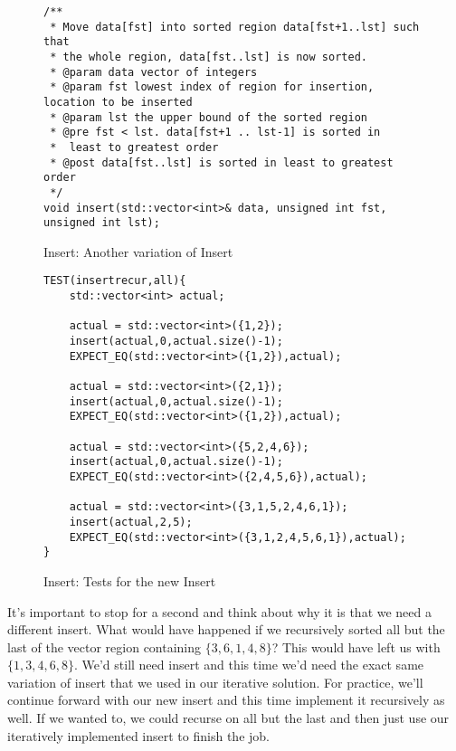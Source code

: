 \documentclass[]{tufte-handout}
\begin{document}
\begin{figure}[!htbp]
\begin{lstlisting}
/**
 * Move data[fst] into sorted region data[fst+1..lst] such that
 * the whole region, data[fst..lst] is now sorted.
 * @param data vector of integers
 * @param fst lowest index of region for insertion, location to be inserted
 * @param lst the upper bound of the sorted region
 * @pre fst < lst. data[fst+1 .. lst-1] is sorted in
 *  least to greatest order
 * @post data[fst..lst] is sorted in least to greatest order
 */
void insert(std::vector<int>& data, unsigned int fst, unsigned int lst);
\end{lstlisting}
\caption{Insert: Another variation of Insert}
\label{code:insertrecdecl}
\end{figure}

\begin{figure}[!htbp]
\begin{lstlisting}
TEST(insertrecur,all){
    std::vector<int> actual;

    actual = std::vector<int>({1,2});
    insert(actual,0,actual.size()-1);
    EXPECT_EQ(std::vector<int>({1,2}),actual);

    actual = std::vector<int>({2,1});
    insert(actual,0,actual.size()-1);
    EXPECT_EQ(std::vector<int>({1,2}),actual);

    actual = std::vector<int>({5,2,4,6});
	insert(actual,0,actual.size()-1);
    EXPECT_EQ(std::vector<int>({2,4,5,6}),actual);

    actual = std::vector<int>({3,1,5,2,4,6,1});
	insert(actual,2,5);
    EXPECT_EQ(std::vector<int>({3,1,2,4,5,6,1}),actual);
}
\end{lstlisting}
\caption{Insert: Tests for the new Insert}
\label{code:insertrectests}
\end{figure}

It's important to stop for a second and think about why it is that we need a different insert. What would have happened if we recursively sorted all but the last of the vector region containing $\{3,6,1,4,8\}$? This would have left us with $\{1,3,4,6,8\}$. We'd still need insert and this time we'd need the exact same variation of insert that we used in our iterative solution. For practice, we'll continue forward with our new insert and this time implement it recursively as well. If we wanted to, we could recurse on all but the last and then just use our iteratively implemented insert to finish the job.
\end{document}
